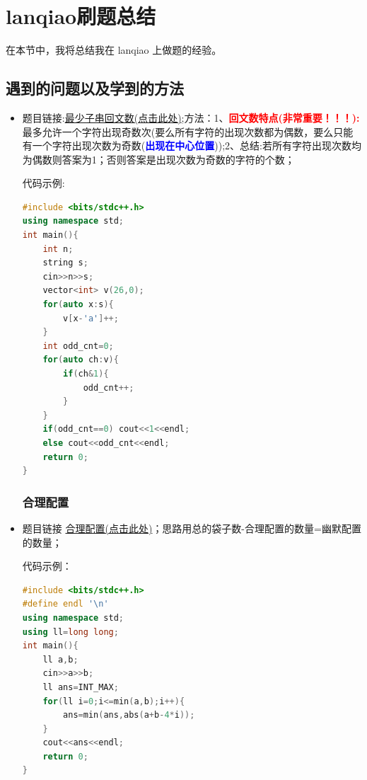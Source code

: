 \section{lanqiao刷题总结}
在本节中，我将总结我在 lanqiao 上做题的经验。

\subsection{遇到的问题以及学到的方法}
\begin{itemize}
\subsubsection{最少回文子串}
\item 题目链接:\href{https://www.lanqiao.cn/problems/21192/learning/?contest_id=274}{最少子串回文数(点击此处)};方法：1、\textcolor{red}{\textbf{回文数特点(非常重要！！！):}}最多允许一个字符出现奇数次(要么所有字符的出现次数都为偶数，要么只能有一个字符出现次数为奇数(\textcolor{blue}{\textbf{出现在中心位置}}));2、总结:若所有字符出现次数均为偶数则答案为1；否则答案是出现次数为奇数的字符的个数；
	
代码示例:\\
\begin{lstlisting}[language=C++]
#include <bits/stdc++.h>
using namespace std;
int main(){
	int n;
	string s;
	cin>>n>>s;
	vector<int> v(26,0);
	for(auto x:s){
		v[x-'a']++;
	}
	int odd_cnt=0;
	for(auto ch:v){
		if(ch&1){
			odd_cnt++;
		}
	}
	if(odd_cnt==0) cout<<1<<endl;
	else cout<<odd_cnt<<endl;
	return 0;
}
\end{lstlisting}
\subsubsection{合理配置}
\item 题目链接 \href{https://www.lanqiao.cn/problems/21193/learning/?contest_id=274}{合理配置(点击此处)}；思路用总的袋子数-合理配置的数量=幽默配置的数量；
	
代码示例：\\
\newpage
\begin{lstlisting}[language=C++]
#include <bits/stdc++.h>
#define endl '\n'
using namespace std;
using ll=long long;
int main(){
	ll a,b;
	cin>>a>>b;
	ll ans=INT_MAX;
	for(ll i=0;i<=min(a,b);i++){
		ans=min(ans,abs(a+b-4*i));
	}
	cout<<ans<<endl;
	return 0;
}
\end{lstlisting}
\end{itemize}





















